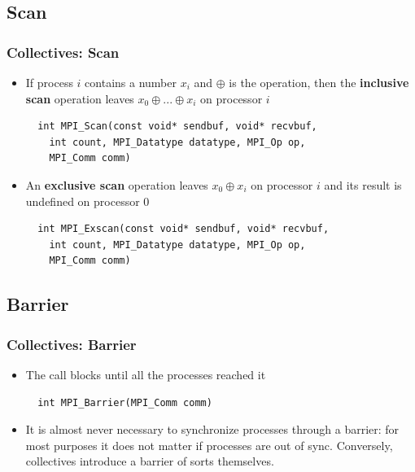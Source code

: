 \documentclass{beamer}
\begin{document}
\subsection{Scan}
\begin{frame}[fragile]
  \frametitle{Collectives: Scan}
\begin{itemize}
\item If process $i$ contains a number $x_i$ and $\oplus$ is the operation, then the {\color{mycolordef}\textbf{inclusive scan}} operation leaves $x_0 \oplus ... \oplus x_i$ on processor $i$
{\color{mycolorcode}
\begin{verbatim}
  int MPI_Scan(const void* sendbuf, void* recvbuf, 
    int count, MPI_Datatype datatype, MPI_Op op, 
    MPI_Comm comm)
\end{verbatim}
}
\item An {\color{mycolordef}\textbf{exclusive scan}} operation leaves  $x_0 \oplus x_i$ on processor $i$ and its result is undefined on processor $0$
{\color{mycolorcode}
\begin{verbatim}
  int MPI_Exscan(const void* sendbuf, void* recvbuf, 
    int count, MPI_Datatype datatype, MPI_Op op, 
    MPI_Comm comm)
\end{verbatim}
}
\end{itemize}
\end{frame}

\subsection{Barrier}
\begin{frame}[fragile]
  \frametitle{Collectives: Barrier}
\begin{itemize}
\item The call blocks until all the processes reached it
{\color{mycolorcode}
\begin{verbatim}
  int MPI_Barrier(MPI_Comm comm)
\end{verbatim}
}
\item It is almost never necessary to synchronize processes through a barrier: for most purposes it does not matter if processes are out of sync. Conversely, collectives introduce a barrier of sorts themselves.
\end{itemize}
\end{frame}
\end{document}
